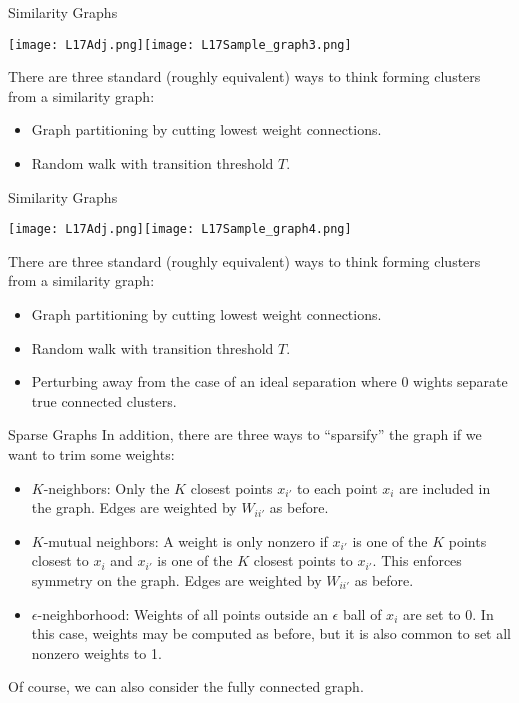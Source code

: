 \documentclass[10pt, table, dvipsnames,xcdraw, handout]{beamer}
\begin{document}
\begin{frame}[fragile]{Similarity Graphs}
  \begin{minipage}[t][0.5\textheight][t]{\textwidth}
	\centering \texttt{[image: L17Adj.png]}\texttt{[image: L17Sample\_graph3.png]} 
  \end{minipage}
  \vfill
\begin{minipage}[t][0.5\textheight][t]{\textwidth}
There are three standard (roughly equivalent) ways to think forming clusters from a similarity graph: 
\begin{itemize}
\item[] Graph partitioning by cutting lowest weight connections. 
\item[] Random walk with transition threshold $T$.
\end{itemize}
\end{minipage}
\end{frame}

\begin{frame}[fragile]{Similarity Graphs}
  \begin{minipage}[t][0.5\textheight][t]{\textwidth}
	\centering \texttt{[image: L17Adj.png]}\texttt{[image: L17Sample\_graph4.png]} 
  \end{minipage}
  \vfill
\begin{minipage}[t][0.5\textheight][t]{\textwidth}
There are three standard (roughly equivalent) ways to think forming clusters from a similarity graph: 
\begin{itemize}
\item[] Graph partitioning by cutting lowest weight connections. 
\item[] Random walk with transition threshold $T$.
\item[] Perturbing away from the case of an ideal separation where 0 wights separate true connected clusters.  
\end{itemize}
\end{minipage}
\end{frame}


\begin{frame}[fragile]{Sparse Graphs}
In addition, there are three ways to ``sparsify'' the graph if we want to trim some weights:\pause
\begin{itemize}
\item[] $K$-neighbors: Only the $K$ closest points $x_{i'}$ to each point $x_i$ are included in the graph. Edges are weighted by $W_{ii'}$ as before.  \pause
\item[] $K$-mutual neighbors: A weight is only nonzero if $x_{i'}$ is one of the $K$ points closest to $x_i$ and $x_{i'}$ is one of the $K$ closest points to $x_{i'}$. This enforces symmetry on the graph. Edges are weighted by $W_{ii'}$ as before. \pause
\item[] $\epsilon$-neighborhood: Weights of all points outside an $\epsilon$ ball of $x_i$ are set to 0. In this case, weights may be computed as before, but it is also common to set all nonzero weights to 1. \pause
\end{itemize}
Of course, we can also consider the fully connected graph. 
\end{frame}
\end{document}
